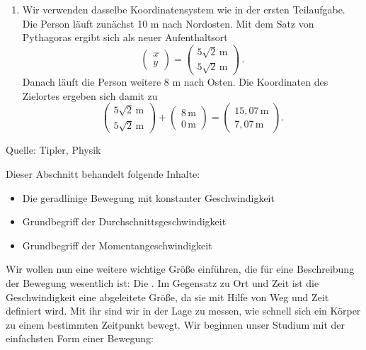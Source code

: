 \begin{MExercises}
\begin{MExercise}
\begin{MSolution}
\begin{enumerate}
\item  Wir verwenden dasselbe Koordinatensystem wie in der ersten Teilaufgabe. Die Person l\"auft zun\"achst 10 m nach Nordosten. Mit dem Satz von Pythagoras ergibt sich als neuer Aufenthaltsort
$$
\left(\begin{array}{c} x \\ y \end{array}\right)=\left(\begin{array}{c} 5\sqrt{2}\,\text{m} \\ 5\sqrt{2}\,\text{m} \end{array}\right)\,. 
$$ Danach l\"auft die Person weitere 8 m nach Osten. Die Koordinaten des Zielortes ergeben sich damit zu
$$
\left(\begin{array}{c} 5\sqrt{2}\,\text{m} \\ 5\sqrt{2}\,\text{m} \end{array}\right)+\left(\begin{array}{c} 8\,\text{m} \\ 0\,\text{m} \end{array}\right)= \left(\begin{array}{c} {15,07}\,\text{m} \\{7,07}\,\text{m} \end{array}\right).
$$ 
\end{enumerate}
\end{MSolution}

Quelle: Tipler, Physik
\end{MExercise}
\end{MExercises}




\begin{MIntro} 

Dieser Abschnitt behandelt folgende Inhalte:
\begin{itemize}
\item{Die geradlinige Bewegung mit konstanter Geschwindigkeit}
\item{Grundbegriff der Durchschnittsgeschwindigkeit}
\item{Grundbegriff der Momentangeschwindigkeit}
\end{itemize}


Wir wollen nun eine weitere wichtige Gr\"o{\ss}e einf\"uhren, die f\"ur eine Beschreibung der Bewegung wesentlich ist: Die . Im Gegensatz zu Ort und Zeit ist die Geschwindigkeit eine abgeleitete Gr\"o{\ss}e, da sie mit Hilfe von Weg und Zeit definiert wird. Mit ihr sind wir in der Lage zu messen, wie schnell sich ein K\"orper zu einem bestimmten  Zeitpunkt bewegt. Wir beginnen unser Studium mit der einfachsten Form einer Bewegung:
\end{MIntro}

